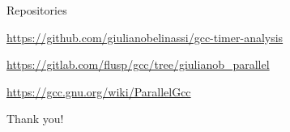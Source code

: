 \begin{frame}{Repositories}
  \overview

  {%
    \centering\noindent%
    \url{https://github.com/giulianobelinassi/gcc-timer-analysis}\par
    \url{https://gitlab.com/flusp/gcc/tree/giulianob\_parallel}\par
    \url{https://gcc.gnu.org/wiki/ParallelGcc}\par
  }

\end{frame}

\begin{frame}[standout]
    Thank you!
\end{frame}

\appendix

